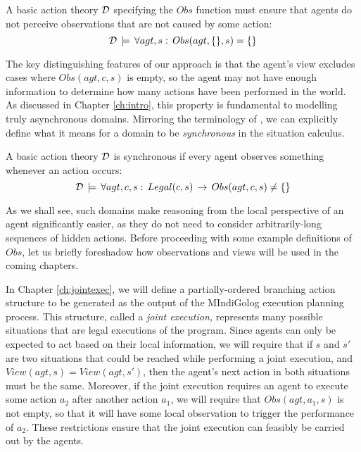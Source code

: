 \begin{defnL}
 A basic action theory
$\mathcal{D}$ specifying the $Obs$ function must ensure that agents do not
perceive observations that are not caused by some action:\[
\mathcal{D}\,\models\,\forall agt,s:\, Obs(agt,\{\},s)=\{\}\]

\end{defnL}
The key distinguishing features of our approach is that the agent's
view excludes cases where $Obs(agt,c,s)$ is empty, so the agent may
not have enough information to determine how many actions have been
performed in the world. As discussed in Chapter \ref{ch:intro}, this
property is fundamental to modelling truly asynchronous domains. Mirroring
the terminology of \citep{vanBentham06tree_of_knowledge}, we can
explicitly define what it means for a domain to be \emph{synchronous}
in the situation calculus.

\begin{defnL}
 A basic action theory $\mathcal{D}$
is synchronous if every agent observes something whenever an action
occurs:\label{def:Synchronous-Action-Theory}\[
\mathcal{D}\,\models\,\forall agt,c,s:\, Legal(c,s)\,\rightarrow\, Obs(agt,c,s)\neq\{\}\]

\end{defnL}
As we shall see, such domains make reasoning from the local perspective
of an agent significantly easier, as they do not need to consider
arbitrarily-long sequences of hidden actions. Before proceeding with
some example definitions of $Obs$, let us briefly foreshadow how
observations and views will be used in the coming chapters.

In Chapter \ref{ch:jointexec}, we will define a partially-ordered
branching action structure to be generated as the output of the MIndiGolog
execution planning process. This structure, called a \emph{joint execution,}
represents many possible situations that are legal executions of the
program. Since agents can only be expected to act based on their local
information, we will require that if $s$ and $s'$ are two situations
that could be reached while performing a joint execution, and $View(agt,s)=View(agt,s')$,
then the agent's next action in both situations must be the same.
Moreover, if the joint execution requires an agent to execute some
action $a_{2}$ after another action $a_{1}$, we will require that
$Obs(agt,a_{1},s)$ is not empty, so that it will have some local
observation to trigger the performance of $a_{2}$. These restrictions
ensure that the joint execution can feasibly be carried out by the
agents.

